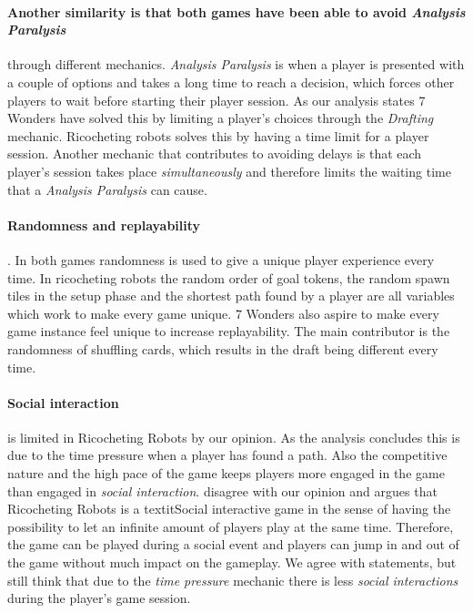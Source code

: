 \documentclass[a4paper]{article}
\begin{document}
  \paragraph{Another similarity is that both games have been able to avoid \textit{Analysis Paralysis}} through different mechanics.
  \textit{Analysis Paralysis} is when a player is presented with a couple of options and takes a long time to reach a decision, which forces other players to wait before starting their player session.
  As our analysis states 7 Wonders have solved this by limiting a player's choices through the \textit{Drafting} mechanic.
  Ricocheting robots solves this by having a time limit for a player session.
  Another mechanic that contributes to avoiding delays is that each player's session takes place \textit{simultaneously} and therefore limits the waiting time that a \textit{Analysis Paralysis} can cause.

  \paragraph{Randomness and replayability}.
  In both games randomness is used to give a unique player experience every time.
  In ricocheting robots the random order of goal tokens, the random spawn tiles in the setup phase and the shortest path found by a player are all variables which work to make every game unique. 
  7 Wonders also aspire to make every game instance feel unique to increase replayability. The main contributor is the randomness of shuffling cards, which results in the draft being different every time.

  \paragraph{Social interaction} is limited in Ricocheting Robots by our opinion.
  As the analysis concludes this is due to the time pressure when a player has found a path.
  Also the competitive nature and the high pace of the game keeps players more engaged in the game than engaged in \textit{social interaction}.
   disagree with our opinion and argues that Ricocheting Robots is a textit{Social interactive} game in the sense of having the possibility to let an infinite amount of players play at the same time.
  Therefore, the game can be played during a social event and players can jump in and out of the game without much impact on the gameplay.
  We agree with \citeauthor{danbeckRR} statements, but still think that due to the \textit{time pressure} mechanic there is less \textit{social interactions} during the player's game session.
\end{document}
